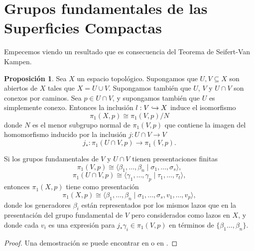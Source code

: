 \documentclass[10pt]{report}
\theoremstyle{definition}
\newtheorem{prop}[defin]{Proposición}
\begin{document}
\section{Grupos fundamentales de las Superficies Compactas}
Empecemos viendo un resultado que es consecuencia del Teorema de Seifert-Van Kampen.
\begin{prop}\label{teo:svk}
Sea $X$ un espacio topológico. Supongamos que $U,V\subseteq X$ son abiertos de $X$ tales que $X=U\cup V$. Supongamos también que $U$, $V$ y $U\cap V$ son conexos por caminos. Sea $p\in U\cap V$, y supongamos también que $U$ es simplemente conexo. Entonces la inclusión $l: V\xhookrightarrow{} X$ induce el isomorfismo
\[
\pi_1 (X,p) \cong \pi_1 (V,p) / N
\]
donde $N$ es el menor subgrupo normal de $\pi_1 (V,p)$ que contiene la imagen del homomorfismo inducido por la inclusión $j:U\cap V\to V$
\[ 
j_*: \pi_1 (U\cap V, p) \to \pi_1 (V,p).
\]

Si los grupos fundamentales de $V$ y $U\cap V$ tienen presentaciones finitas
\[
\pi_1 (V,p) \cong \langle \beta_1 , \dots , \beta_n \mid \sigma_1 , \dots ,\sigma_s \rangle 
,
\]
\[
\pi_1 (U\cap V, p) \cong \langle \gamma_1 , \dots , \gamma_p \mid \tau_1 ,\dots , \tau_t \rangle ,
\]
entonces $\pi_1 (X, p)$ tiene como presentación 
\[
\pi_1 (X,p) \cong \langle \beta_1 , \dots , \beta_n \mid \sigma_1 , \dots ,\sigma_s , v_1 , \dots ,v_p \rangle,
\]
donde  los generadores $\beta_i$ están representados por los mismos lazos que en la presentación del grupo fundamental de $V$ pero considerados como lazos en $X$, y donde cada $v_i$ es una expresión para $j_* \gamma_i \in \pi_1 (V,p)$ en términos de $\{ \beta_1 \dots ,\beta_n \}$.
\end{prop}
\begin{proof}
Una demostración se puede encontrar en \cite{lee1} o en \cite{munkres}.
\end{proof}
\end{document}
